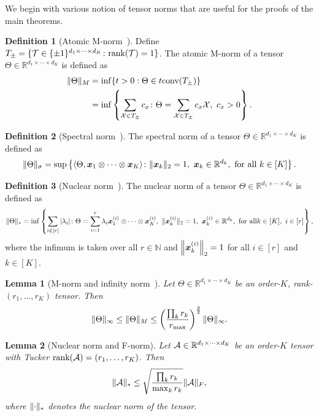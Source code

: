 \documentclass[11pt]{article}
\theoremstyle{plain}
\newtheorem{lem}{Lemma}
\theoremstyle{definition}
\newtheorem{defn}{Definition}
\begin{document}
We begin with various notion of tensor norms that are useful for the proofs of the main theorems.

\begin{defn}[Atomic M-norm~\citep{ghadermarzy2019near}]
Define $T_{\pm}=\{\mathcal{T}\in\{\pm 1 \}^{d_1\times \cdots \times d_K}\colon \text{rank}(\mathcal{T})=1\}$. The atomic M-norm of a tensor $\Theta\in\mathbb{R}^{d_1\times \cdots \times d_K}$ is defined as
\begin{align}
\lVert\Theta\rVert_M&=\inf\{t>0: \Theta\in t\text{conv}(T_{\pm})\}\\
&=\inf\left\{\sum_{\mathcal{X}\in T_{\pm}}c_x\colon \Theta=\sum_{\mathcal{X}\in T_{\pm}} c_x\mathcal{X}, \ c_x>0\right\}.
\end{align}
\end{defn}

\begin{defn}[Spectral norm~\citep{lim2005singular}]
The spectral norm of a tensor $\Theta\in\mathbb{R}^{d_1\times \cdots \times d_K}$ is defined as
\[
\snormSize{}{\Theta}=\sup\left\{\langle \Theta, \mx_1\otimes \cdots \otimes \mx_K\rangle \colon \vnormSize{}{\mx_k}=1,\ \mx_k\in\mathbb{R}^{d_k},\ \text{for all}\ k\in[K]\right\}.
\]
\end{defn}

\begin{defn}[Nuclear norm~\citep{friedland2018nuclear}]
The nuclear norm of a tensor $\Theta\in\mathbb{R}^{d_1\times \cdots \times d_K}$ is defined as
\[
\nnormSize{}{\Theta}=\inf
\left\{
\sum_{i\in[r]}|\lambda_i|\colon \Theta=\sum_{i=1}^r \lambda_i\mx^{(i)}_1\otimes \cdots \otimes \mx^{(i)}_K,\ \vnormSize{}{\mx^{(i)}_k}=1,\ \mx^{(i)}_k\in\mathbb{R}^{d_k},\ \text{for all} k\in[K],\ i\in[r]
\right\},
\]
where the infimum is taken over all $r\in\mathbb{N}$ and $\left\lVert\bm x^{(i)}_k\right\rVert_2=1$ for all $i\in[r]$ and $k\in[K]$.
\end{defn}



\begin{lem}[M-norm and infinity norm~\citep{ghadermarzy2019near}]\label{lem:Mnormbound}
Let $\Theta\in\mathbb{R}^{d_1\times \cdots \times d_K}$ be an order-$K$, rank-$(r_1,\ldots,r_K)$ tensor. Then
\[
\lVert\Theta\rVert_\infty\leq \lVert\Theta\rVert_M\leq \left(\prod_k r_k \over r_{\max}\right)^{3\over 2} \lVert\Theta\rVert_\infty.
\]
\end{lem}


\begin{lem}[Nuclear norm and F-norm] \label{lem:nuclear}
Let $\mathcal{A}\in\mathbb{R}^{d_1\times\cdots\times d_K}$ be an order-$K$ tensor with Tucker $\text{rank}(\mathcal{A})=(r_1,\ldots,r_K)$. Then
\[
\lVert\mathcal{A}\rVert_* \leq \sqrt{\prod_k r_k\over \max_k r_k} \lVert\mathcal{A}\rVert_F,
\]
where $\lVert\cdot\rVert_*$ denotes the nuclear norm of the tensor.
\end{lem}
\end{document}
